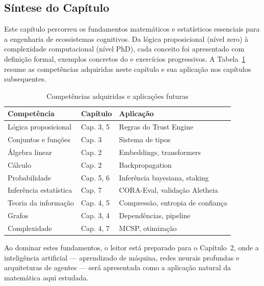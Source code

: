 \subsection{Síntese do Capítulo}
Este capítulo percorreu os fundamentos matemáticos e estatísticos
essenciais para a engenharia de ecossistemas cognitivos. Da lógica
proposicional (nível zero) à complexidade computacional (nível PhD), cada
conceito foi apresentado com definição formal, exemplos concretos do
\opencodeeco{} e exercícios progressivos.
A Tabela~\ref{tab:competencias} resume as competências adquiridas neste
capítulo e sua aplicação nos capítulos subsequentes.
\begin{table}[htb]
\centering
\caption{Competências adquiridas e aplicações futuras}
\label{tab:competencias}
\begin{tabular}{lll}
\toprule
\textbf{Competência} & \textbf{Capítulo} & \textbf{Aplicação} \\
\midrule
Lógica proposicional & Cap. 3, 5 & Regras do Trust Engine \\
Conjuntos e funções & Cap. 3 & Sistema de tipos \\
Álgebra linear & Cap. 2 & Embeddings, transformers \\
Cálculo & Cap. 2 & Backpropagation \\
Probabilidade & Cap. 5, 6 & Inferência bayesiana, staking \\
Inferência estatística & Cap. 7 & CORA-Eval, validação Aletheia \\
Teoria da informação & Cap. 4, 5 & Compressão, entropia de confiança \\
Grafos & Cap. 3, 4 & Dependências, pipeline \\
Complexidade & Cap. 4, 7 & MCSP, otimização \\
\bottomrule
\end{tabular}
\end{table}
Ao dominar estes fundamentos, o leitor está preparado para o Capítulo~2,
onde a inteligência artificial --- aprendizado de máquina, redes neurais
profundas e arquiteturas de agentes --- será apresentada como a aplicação
natural da matemática aqui estudada.
